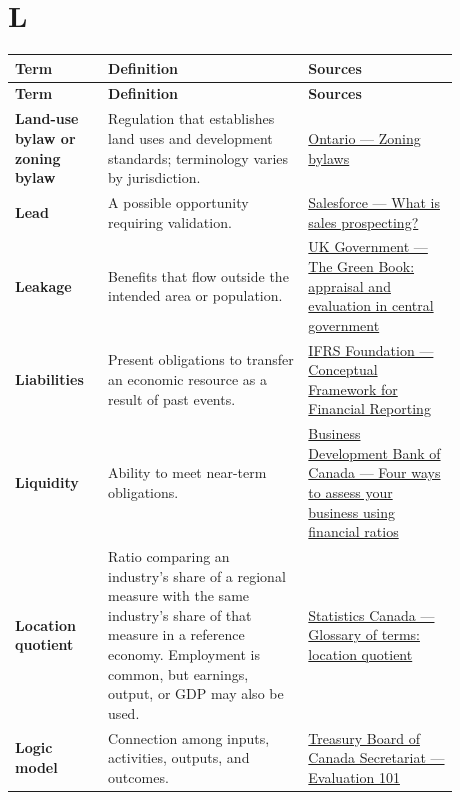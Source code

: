\documentclass[11pt,letterpaper,oneside,openany]{book}
\begin{document}
\section[L]{L}
\begin{center}
\small
\setlength{\LTpre}{0.4em}
\setlength{\LTpost}{0.8em}
\begin{longtable}{>{\RaggedRight\arraybackslash}p{0.180\linewidth}>{\RaggedRight\arraybackslash}p{0.400\linewidth}>{\RaggedRight\arraybackslash}p{0.300\linewidth}}
\rowcolor{DeepNavy}
\color{white}\bfseries Term & \color{white}\bfseries Definition & \color{white}\bfseries Sources \\
\endfirsthead
\rowcolor{DeepNavy}
\color{white}\bfseries Term & \color{white}\bfseries Definition & \color{white}\bfseries Sources \\
\endhead
\textbf{Land-use bylaw or zoning bylaw} & Regulation that establishes land uses and development standards; terminology varies by jurisdiction. & \href{https://www.ontario.ca/document/citizens-guide-land-use-planning/zoning-bylaws}{Ontario --- Zoning bylaws} \\
\textbf{Lead} & A possible opportunity requiring validation. & \href{https://www.salesforce.com/sales/prospecting/}{Salesforce --- What is sales prospecting?} \\
\textbf{Leakage} & Benefits that flow outside the intended area or population. & \href{https://www.gov.uk/government/publications/the-green-book-appraisal-and-evaluation-in-central-government/the-green-book-2026}{UK Government --- The Green Book: appraisal and evaluation in central government} \\
\textbf{Liabilities} & Present obligations to transfer an economic resource as a result of past events. & \href{https://www.ifrs.org/issued-standards/list-of-standards/conceptual-framework/?headerSearchOption=phrase}{IFRS Foundation --- Conceptual Framework for Financial Reporting} \\
\textbf{Liquidity} & Ability to meet near-term obligations. & \href{https://www.bdc.ca/en/articles-tools/money-finance/manage-finances/financial-ratios-4-ways-assess-business}{Business Development Bank of Canada --- Four ways to assess your business using financial ratios} \\
\textbf{Location quotient} & Ratio comparing an industry's share of a regional measure with the same industry's share of that measure in a reference economy. Employment is common, but earnings, output, or GDP may also be used. & \href{https://www150.statcan.gc.ca/n1/pub/21-006-x/2008007/def-eng.htm}{Statistics Canada --- Glossary of terms: location quotient} \\
\textbf{Logic model} & Connection among inputs, activities, outputs, and outcomes. & \href{https://www.canada.ca/en/treasury-board-secretariat/services/audit-evaluation/evaluation-government-canada/evaluation-101-backgrounder.html}{Treasury Board of Canada Secretariat --- Evaluation 101} \\
\end{longtable}
\end{center}
\end{document}
